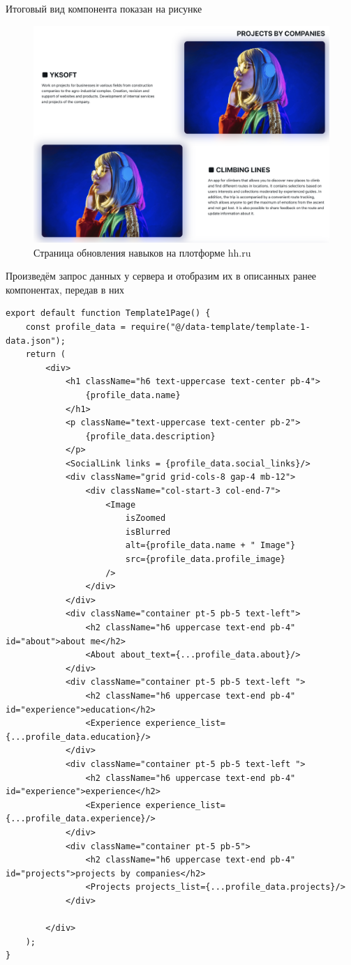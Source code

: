 \documentclass[master, och, pract]{SCWorks}
\begin{document}
Итоговый вид компонента показан на рисунке 
\begin{figure}[!ht]
    \centering
    \includegraphics[width=12cm]{images/image-resume-3.png}
    \caption{\label{fig:4}%
        Страница обновления навыков на плотформе hh.ru}
\end{figure}


Произведём запрос данных у сервера и отобразим их в описанных ранее компонентах, передав в них  
\begin{verbatim}
export default function Template1Page() {
    const profile_data = require("@/data-template/template-1-data.json");
	return (
		<div>
			<h1 className="h6 text-uppercase text-center pb-4">
                {profile_data.name}
            </h1>
            <p className="text-uppercase text-center pb-2">
                {profile_data.description}
            </p>
            <SocialLink links = {profile_data.social_links}/>
            <div className="grid grid-cols-8 gap-4 mb-12">
                <div className="col-start-3 col-end-7">
                    <Image
                        isZoomed
                        isBlurred
                        alt={profile_data.name + " Image"}
                        src={profile_data.profile_image}
                    />
                </div>
            </div>
			<div className="container pt-5 pb-5 text-left">
				<h2 className="h6 uppercase text-end pb-4" id="about">about me</h2>
                <About about_text={...profile_data.about}/>
    		</div>
            <div className="container pt-5 pb-5 text-left ">
                <h2 className="h6 uppercase text-end pb-4" id="experience">education</h2>
                <Experience experience_list={...profile_data.education}/>
            </div>
            <div className="container pt-5 pb-5 text-left ">
                <h2 className="h6 uppercase text-end pb-4" id="experience">experience</h2>
                <Experience experience_list={...profile_data.experience}/>
            </div>
            <div className="container pt-5 pb-5">
                <h2 className="h6 uppercase text-end pb-4" id="projects">projects by companies</h2>
                <Projects projects_list={...profile_data.projects}/>
            </div>

	    </div>
	);
}    
\end{verbatim}
\end{document}

